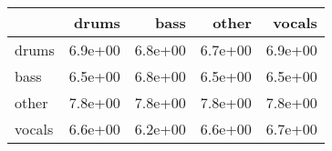 \begin{tabular}{lrrrr}
\toprule
{} &   drums &    bass &   other &  vocals \\
\midrule
drums  & 6.9e+00 & 6.8e+00 & 6.7e+00 & 6.9e+00 \\
bass   & 6.5e+00 & 6.8e+00 & 6.5e+00 & 6.5e+00 \\
other  & 7.8e+00 & 7.8e+00 & 7.8e+00 & 7.8e+00 \\
vocals & 6.6e+00 & 6.2e+00 & 6.6e+00 & 6.7e+00 \\
\bottomrule
\end{tabular}

